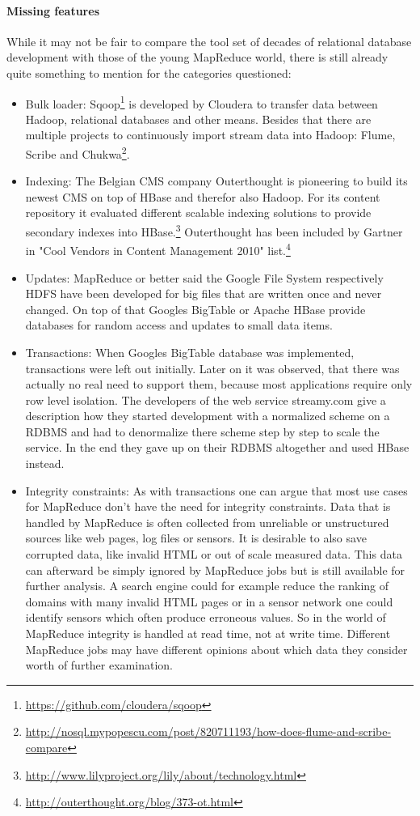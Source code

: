 \documentclass[12pt,a4paper]{scrartcl}		%
\begin{document}
\paragraph{Missing features}
While it may not be fair to compare the tool set of decades of relational database development with those of the young MapReduce world, there is still already quite something to mention for the categories questioned:

\begin{itemize}
\item Bulk loader: Sqoop\footnote{\url{https://github.com/cloudera/sqoop}} is developed by Cloudera to transfer data between Hadoop, relational databases and other means. Besides that there are multiple projects to continuously import stream data into Hadoop: Flume, Scribe and Chukwa\footnote{\url{http://nosql.mypopescu.com/post/820711193/how-does-flume-and-scribe-compare}}.
\item Indexing: The Belgian CMS company Outerthought is pioneering to build its newest CMS on top of HBase and therefor also Hadoop. For its content repository it evaluated different scalable indexing solutions to provide secondary indexes into HBase.\footnote{\url{http://www.lilyproject.org/lily/about/technology.html}} Outerthought has been included by Gartner in "Cool Vendors in Content Management 2010" list.\footnote{\url{http://outerthought.org/blog/373-ot.html}}
\item Updates: MapReduce or better said the Google File System respectively HDFS have been developed for big files that are written once and never changed. On top of that Googles BigTable or Apache HBase provide databases for random access and updates to small data items.
\item Transactions: When Googles BigTable database was implemented, transactions were left out initially. Later on it was observed, that there was actually no real need to support them, because most applications require only row level isolation.\cite[p. 12]{Chang:2006:BDS:1267308.1267323} The developers of the web service streamy.com give a description how they started development with a normalized scheme on a RDBMS and had to denormalize there scheme step by step to scale the service. In the end they gave up on their RDBMS altogether and used HBase instead.\cite[p. 431-435]{White201010}
\item Integrity constraints: As with transactions one can argue that most use cases for MapReduce don't have the need for integrity constraints. Data that is handled by MapReduce is often collected from unreliable or unstructured sources like web pages, log files or sensors. It is desirable to also save corrupted data, like invalid HTML or out of scale measured data. This data can afterward be simply ignored by MapReduce jobs but is still available for further analysis. A search engine could for example reduce the ranking of domains with many invalid HTML pages or in a sensor network one could identify sensors which often produce erroneous values. So in the world of MapReduce integrity is handled at read time, not at write time. Different MapReduce jobs may have different opinions about which data they consider worth of further examination.

\end{itemize}
\end{document}
